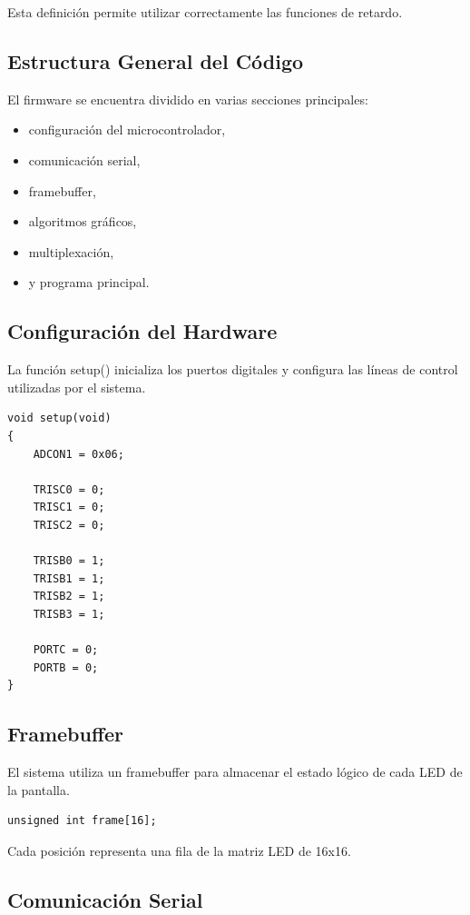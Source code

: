 Esta definición permite utilizar correctamente las funciones de retardo.

\subsection{Estructura General del Código}

El firmware se encuentra dividido en varias secciones principales:

\begin{itemize}
    \item configuración del microcontrolador,
    \item comunicación serial,
    \item framebuffer,
    \item algoritmos gráficos,
    \item multiplexación,
    \item y programa principal.
\end{itemize}

\subsection{Configuración del Hardware}

La función setup() inicializa los puertos digitales y configura las líneas de control utilizadas por el sistema.

\begin{verbatim}
void setup(void)
{
    ADCON1 = 0x06;

    TRISC0 = 0;
    TRISC1 = 0;
    TRISC2 = 0;

    TRISB0 = 1;
    TRISB1 = 1;
    TRISB2 = 1;
    TRISB3 = 1;

    PORTC = 0;
    PORTB = 0;
}
\end{verbatim}

\subsection{Framebuffer}

El sistema utiliza un framebuffer para almacenar el estado lógico de cada LED de la pantalla.

\begin{verbatim}
unsigned int frame[16];
\end{verbatim}

Cada posición representa una fila de la matriz LED de 16x16.

\subsection{Comunicación Serial}

